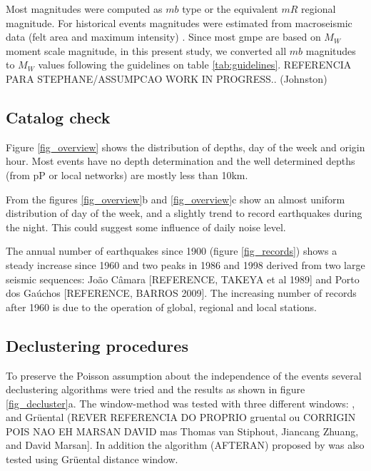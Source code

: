 \documentclass[draft, grl]{agutex}
\begin{document}
\begin{article}
Most magnitudes were computed as $mb$ type or the equivalent $mR$ \citep{assumpcao_1983} regional magnitude. For historical events magnitudes were estimated from macroseismic data (felt area and maximum intensity) \citep{berrocal_1984}. Since most \gls{gmpe} are based on $M_W$ moment scale magnitude, in this present study, we converted all $mb$ magnitudes to $M_W$ values following the guidelines on table \ref{tab:guidelines}. REFERENCIA PARA STEPHANE/ASSUMPCAO WORK IN PROGRESS.. (Johnston)



\subsection{Catalog check}

Figure \ref{fig_overview} shows the distribution of depths, day of the week and origin hour. Most events have no depth determination and the well determined depths (from pP or local networks) are mostly less than 10km.

From the figures \ref{fig_overview}b and \ref{fig_overview}c show an almost uniform distribution of day of the week, and a slightly trend to record earthquakes during the night. This could suggest some influence of daily noise level.

The annual number of earthquakes since 1900 (figure \ref{fig_records}) shows a steady increase since 1960 and two peaks in 1986 and 1998 derived from two large seismic sequences: João Câmara [REFERENCE, TAKEYA et al 1989] and Porto dos Gaúchos [REFERENCE, BARROS 2009]. The increasing number of records after 1960 is due to the operation of global, regional and local stations.




\subsection{Declustering procedures}

To preserve the Poisson assumption about the independence of the events several declustering algorithms were tried and the results as shown in figure \ref{fig_decluster}a. The window-method \citep{gardner_1974} was tested with three different windows: \citet{gardner_1974}, \citet{uhrhammer_1986} and Gr\"uental \citep{marsan_david_2012}
(REVER REFERENCIA DO PROPRIO gruental ou CORRIGIN POIS NAO EH MARSAN DAVID mas Thomas van Stiphout, Jiancang Zhuang, and David Marsan].
In addition the algorithm (AFTERAN) proposed by \citet{musson_1999} was also tested using Gr\"uental distance window.


\end{article}
\end{document}
